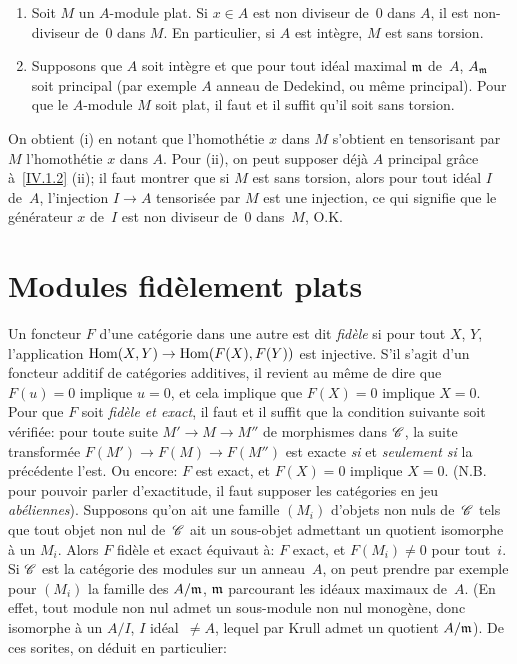 \begin{proposition}
\label{IV.1.3}
\begin{enumerate}
\item[(i)] Soit
$M$ un $A$-module plat. Si $x \in A$ est non diviseur
de~$0$ dans $A$, il est non-diviseur de~$0$ dans $M$. En particulier,
si $A$ est int\`egre, $M$ est sans torsion.
\item[(ii)] Supposons que $A$ soit int\`egre et que pour tout
id\'eal maximal $\mathfrak{m}$ de~$A$, $A_{\mathfrak{m}}$ soit principal
(par exemple $A$ anneau de Dedekind, ou m\^eme principal). Pour que
le $A$-module $M$ soit plat, il faut et
il
suffit qu'il soit sans torsion.
\end{enumerate}
\end{proposition}

On obtient (i) en notant que l'homoth\'etie $x$ dans $M$ s'obtient
en tensorisant par~$M$ l'homoth\'etie $x$ dans $A$. Pour (ii), on
peut supposer d\'ej\`a $A$ principal gr\^ace \`a~\ref{IV.1.2}
(ii); il faut montrer que si $M$ est sans torsion, alors pour tout
id\'eal $I$ de~$A$, l'injection $I \to A$ tensoris\'ee par $M$ est
une injection, ce qui signifie que le g\'en\'erateur $x$ de~$I$
est non diviseur de~$0$ dans~$M$, O.K.

\section{Modules fid\`element plats}
\label{IV.2}

Un foncteur $F$ d'une cat\'egorie dans une autre est dit
\emph{fidèle} si pour tout $X$, $Y$, l'application $\Hom (X,Y) \to
\Hom (F(X),F(Y))$ est injective. S'il s'agit d'un foncteur additif de
cat\'egories additives, il revient au m\^eme de dire que $F(u)=0$
implique $u=0$, et cela implique que $F(X)=0$ implique $X=0$. Pour que
$F$ soit \emph{fidèle et exact}, il faut et il suffit que la
condition suivante soit v\'erifi\'ee: pour toute suite $M' \to M
\to M''$ de morphismes dans $\cal{C}$, la suite transform\'ee
$F(M') \to F(M) \to F(M'')$
est exacte \emph{si} et \emph{seulement si} la
pr\'ec\'edente l'est. Ou encore: $F$ est exact, et $F(X)=0$
implique $X=0$. (N.B. pour pouvoir parler d'exactitude, il faut
supposer les cat\'egories en jeu \emph{abéliennes}). Supposons
qu'on ait une famille $(M_{i})$ d'objets non nuls de~$\cal{C}$ tels
que tout objet non nul de~$\cal{C}$ ait un sous-objet admettant un
quotient isomorphe \`a un $M_{i}$. Alors $F$ fid\`ele et exact
\'equivaut \`a: $F$ exact, et $F(M_{i}) \neq 0$ pour tout~$i$. Si
$\cal{C}$ est la cat\'egorie des modules sur un anneau~$A$, on peut
prendre par exemple pour $(M_{i})$ la famille des $A/\mathfrak{m}$,
$\mathfrak{m}$ parcourant les id\'eaux maximaux de~$A$. (En effet, tout
module non nul admet un sous-module non nul monog\`ene, donc
isomorphe \`a un $A/I$, $I$ id\'eal~$\neq A$, lequel par Krull
admet un quotient $A/\mathfrak{m}$). De ces sorites, on d\'eduit en
particulier:

